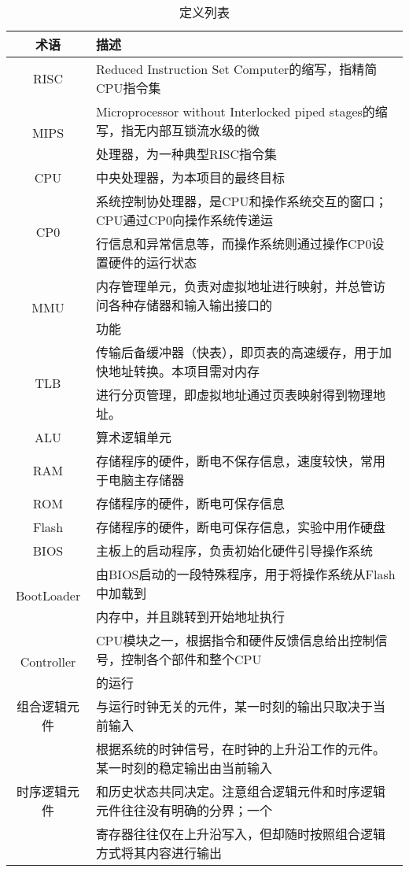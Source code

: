 \begin{table}[h]
	\centering
	\caption{定义列表}
	\begin{tabular}{|c|l|}
		\hline
		术语 & 描述 \\
		\hline
		RISC & Reduced Instruction Set Computer的缩写，指精简CPU指令集 \\
		\hline
		\multirow{2}{*}{MIPS} & Microprocessor without Interlocked piped stages的缩写，指无内部互锁流水级的微 \\
		& 处理器，为一种典型RISC指令集 \\
		\hline
		CPU & 中央处理器，为本项目的最终目标 \\
		\hline
		\multirow{2}{*}{CP0} & 系统控制协处理器，是CPU和操作系统交互的窗口；CPU通过CP0向操作系统传递运 \\
		& 行信息和异常信息等，而操作系统则通过操作CP0设置硬件的运行状态 \\
		\hline
		\multirow{2}{*}{MMU} & 内存管理单元，负责对虚拟地址进行映射，并总管访问各种存储器和输入输出接口的 \\
		& 功能 \\
		\hline
		\multirow{2}{*}{TLB} & 传输后备缓冲器（快表），即页表的高速缓存，用于加快地址转换。本项目需对内存 \\
		& 进行分页管理，即虚拟地址通过页表映射得到物理地址。 \\
		\hline
		ALU & 算术逻辑单元 \\
		\hline
		RAM & 存储程序的硬件，断电不保存信息，速度较快，常用于电脑主存储器 \\
		\hline
		ROM & 存储程序的硬件，断电可保存信息 \\
		\hline
		Flash & 存储程序的硬件，断电可保存信息，实验中用作硬盘 \\
		\hline
		BIOS & 主板上的启动程序，负责初始化硬件引导操作系统 \\
		\hline
		\multirow{2}{*}{BootLoader} & 由BIOS启动的一段特殊程序，用于将操作系统从Flash中加载到 \\
		& 内存中，并且跳转到开始地址执行 \\
		\hline
		\multirow{2}{*}{Controller} & CPU模块之一，根据指令和硬件反馈信息给出控制信号，控制各个部件和整个CPU \\
		& 的运行 \\
		\hline
		组合逻辑元件 & 与运行时钟无关的元件，某一时刻的输出只取决于当前输入 \\
		\hline
		\multirow{3}{*}{时序逻辑元件} & 根据系统的时钟信号，在时钟的上升沿工作的元件。某一时刻的稳定输出由当前输入 \\
		& 和历史状态共同决定。注意组合逻辑元件和时序逻辑元件往往没有明确的分界；一个 \\
		& 寄存器往往仅在上升沿写入，但却随时按照组合逻辑方式将其内容进行输出\\
		\hline
	\end{tabular}
\end{table}
